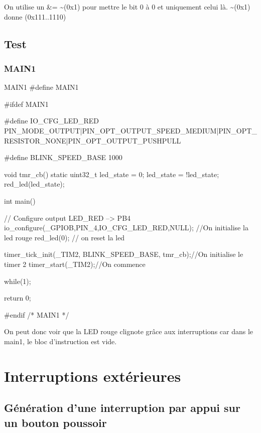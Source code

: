 On utilise un \&= \~{}(0x1) pour mettre le bit 0 à 0 et uniquement celui là.
\~{}(0x1) donne (0x111..1110)\\



\newpage



\section{Test}

\subsection{MAIN1}

\begin{Cpp}{MAIN1} 
#define MAIN1

#ifdef MAIN1

#define IO_CFG_LED_RED  PIN_MODE_OUTPUT|PIN_OPT_OUTPUT_SPEED_MEDIUM|PIN_OPT_RESISTOR_NONE|PIN_OPT_OUTPUT_PUSHPULL

#define BLINK_SPEED_BASE    1000

void tmr_cb()
{
    static uint32_t led_state = 0;
    led_state = !led_state;
	red_led(led_state);
}

int main()
{
    // Configure output LED_RED   --> PB4
	io_configure(_GPIOB,PIN_4,IO_CFG_LED_RED,NULL); //On initialise la led rouge
    red_led(0); // on reset la led

	timer_tick_init(_TIM2, BLINK_SPEED_BASE, tmr_cb);//On initialise le timer 2
	timer_start(_TIM2);//On commence 
	
	while(1){;}
    
	return 0;
}

#endif /* MAIN1 */
\end{Cpp}

On peut donc voir que la LED rouge clignote grâce aux interruptions car dans le main1, le bloc d'instruction  est vide.



\chapter{Interruptions extérieures}


\section{Génération d'une interruption par appui sur un bouton poussoir}

